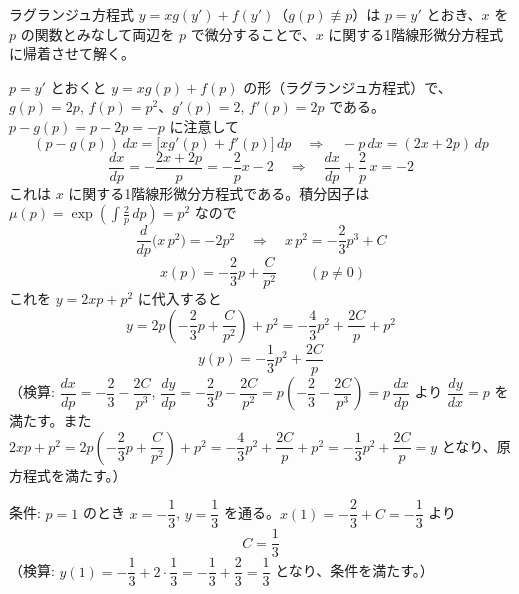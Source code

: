 
ラグランジュ方程式 $y = xg(y') + f(y')$（$g(p) \not\equiv p$）は $p = y'$ とおき、$x$ を $p$ の関数とみなして両辺を $p$ で微分することで、$x$ に関する1階線形微分方程式に帰着させて解く。

$p = y'$ とおくと $y = xg(p) + f(p)$ の形（ラグランジュ方程式）で、$g(p) = 2p$, $f(p) = p^{2}$、$g'(p) = 2$, $f'(p) = 2p$ である。$p - g(p) = p - 2p = -p$ に注意して
\[
(p - g(p))\,dx = \bigl[x g'(p) + f'(p)\bigr]\,dp
\quad\Longrightarrow\quad
-p\,dx = (2x + 2p)\,dp
\]
\[
\frac{dx}{dp} = -\frac{2x + 2p}{p} = -\frac{2}{p}x - 2
\quad\Longrightarrow\quad
\frac{dx}{dp} + \frac{2}{p}\,x = -2
\]
これは $x$ に関する1階線形微分方程式である。積分因子は $\mu(p) = \exp\left(\displaystyle\int \frac{2}{p}\,dp\right) = p^{2}$ なので
\[
\frac{d}{dp}\bigl(x\,p^{2}\bigr) = -2p^{2}
\quad\Longrightarrow\quad
x\,p^{2} = -\frac{2}{3}p^{3} + C
\]
\[
\boxed{\; x(p) = -\frac{2}{3}p + \frac{C}{p^{2}} \;}
\qquad (p \neq 0)
\]
これを $y = 2xp + p^{2}$ に代入すると
\[
y = 2p\left(-\frac{2}{3}p + \frac{C}{p^{2}}\right) + p^{2}
= -\frac{4}{3}p^{2} + \frac{2C}{p} + p^{2}
\]
\[
\boxed{\; y(p) = -\frac{1}{3}p^{2} + \frac{2C}{p} \;}
\]
（検算: $\dfrac{dx}{dp} = -\dfrac{2}{3} - \dfrac{2C}{p^{3}}$, $\dfrac{dy}{dp} = -\dfrac{2}{3}p - \dfrac{2C}{p^{2}} = p\left(-\dfrac{2}{3} - \dfrac{2C}{p^{3}}\right) = p\,\dfrac{dx}{dp}$ より $\dfrac{dy}{dx} = p$ を満たす。また $2xp + p^{2} = 2p\left(-\dfrac23 p + \dfrac{C}{p^2}\right)+p^2 = -\dfrac43p^2+\dfrac{2C}{p}+p^2 = -\dfrac13 p^2+\dfrac{2C}{p} = y$ となり、原方程式を満たす。）

条件: $p = 1$ のとき $x = -\dfrac{1}{3}$, $y = \dfrac{1}{3}$ を通る。$x(1) = -\dfrac{2}{3} + C = -\dfrac{1}{3}$ より
\[
\boxed{\; C = \frac{1}{3} \;}
\]
（検算: $y(1) = -\dfrac{1}{3} + 2 \cdot \dfrac{1}{3} = -\dfrac{1}{3} + \dfrac{2}{3} = \dfrac{1}{3}$ となり、条件を満たす。）
